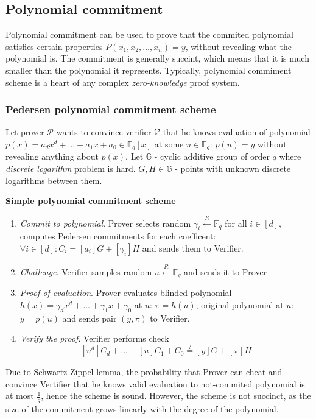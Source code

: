 \documentclass[../lecture-notes-148x210.tex]{subfiles}
\begin{document}
\subsection{Polynomial commitment}

Polynomial commitment can be used to prove that the commited polynomial satisfies certain properties $P(x_1, x_2, \ldots, x_n) = y$, without revealing what the polynomial is.
The commitment is generally succint, which means that it is much smaller than the polynomial it represents. Typically, polynomial commiment scheme is a heart of any complex \textit{zero-knowledge} proof system.

\subsubsection{Pedersen polynomial commitment scheme}

Let prover $\mathcal{P}$ wants to convince verifier $\mathcal{V}$ that he knows evaluation of polynomial $p(x) = a_d x^{d} + \dots + a_1 x + a_0 \in \mathbb{F}_{q}[x]$ at some $u \in \mathbb{F}_q$: $p(u) = y$ without revealing anything about $p(x)$. Let $\mathbb{G}$ - cyclic additive group of order $q$ where \textit{discrete logarithm} problem is hard. $G, H \in \mathbb{G}$ - points with unknown discrete logarithms between them.

\textbf{Simple polynomial commitment scheme}
\begin{enumerate}
    \item \textit{Commit to polynomial}. Prover selects random $\gamma_i \xleftarrow{R} \mathbb{F}_q$ for all $i \in [d]$, computes Pedersen commitments for each coefficent: $\forall i \in [d]: C_i = [a_i]G + [\gamma_i]H$ and sends them to Verifier.
    \item \textit{Challenge}. Verifier samples random $u \xleftarrow{R} \mathbb{F}_q$ and sends it to Prover
    \item \textit{Proof of evaluation}. Prover evaluates blinded polynomial $h(x) = \gamma_d x^{d} + \dots + \gamma_1 x + \gamma_0$ at $u$: $\pi = h(u)$, original polynomial at $u$: $y = p(u)$ and sends pair $(y, \pi)$ to Verifier.
    \item \textit{Verify the proof}. Verifier performs check $$[u^d]C_d + \dots + [u]C_1 + C_0 \stackrel{?}{=} [y]G + [\pi]H$$
\end{enumerate}

Due to Schwartz-Zippel lemma, the probability that Prover can cheat and convince Vertifier that he knows valid evaluation to not-commited polynomial is at most $\frac{1}{q}$, hence the scheme is sound.
However, the scheme is not succinct, as the size of the commitment grows linearly with the degree of the polynomial.
\end{document}
